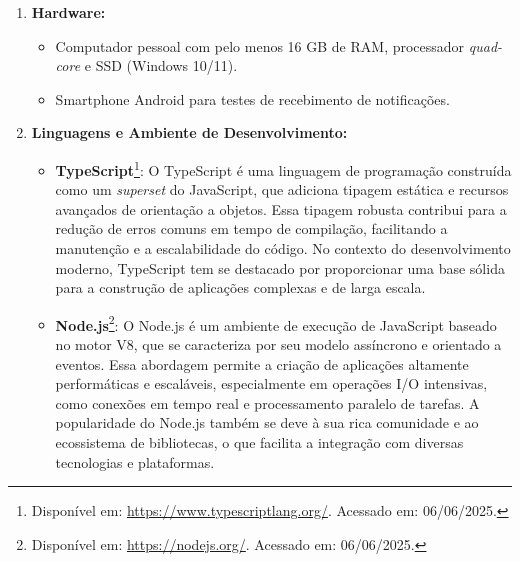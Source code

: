     \begin{enumerate}
        \item \textbf{Hardware:}  
        \begin{itemize}
            \item Computador pessoal com pelo menos 16 GB de RAM, processador \textit{quad-core} e SSD (Windows 10/11).  
            \par\vspace{0.25\baselineskip}

            \item Smartphone Android para testes de recebimento de notificações.  
            \par\vspace{0.75\baselineskip}
        \end{itemize}

        \item \textbf{Linguagens e Ambiente de Desenvolvim\textit{}ento:}  
        \begin{itemize}
            \item \textbf{TypeScript}\footnote{Disponível em: \url{https://www.typescriptlang.org/}. Acessado em: 06/06/2025.}: 
                O TypeScript é uma linguagem de programação construída como um \textit{superset} do JavaScript, que adiciona tipagem estática e recursos avançados de orientação a objetos. Essa tipagem robusta contribui para a redução de erros comuns em tempo de compilação, facilitando a manutenção e a escalabilidade do código. No contexto do desenvolvimento moderno, TypeScript tem se destacado por proporcionar uma base sólida para a construção de aplicações complexas e de larga escala. %
            \par\vspace{0.25\baselineskip}

            \item \textbf{Node.js}\footnote{Disponível em: \url{https://nodejs.org/}. Acessado em: 06/06/2025.}: 
                O Node.js é um ambiente de execução de JavaScript baseado no motor V8, que se caracteriza por seu modelo assíncrono e orientado a eventos. Essa abordagem permite a criação de aplicações altamente performáticas e escaláveis, especialmente em operações I/O intensivas, como conexões em tempo real e processamento paralelo de tarefas. A popularidade do Node.js também se deve à sua rica comunidade e ao ecossistema de bibliotecas, o que facilita a integração com diversas tecnologias e plataformas. %
            \par\vspace{0.25\baselineskip}


\end{itemize}
\end{enumerate}
